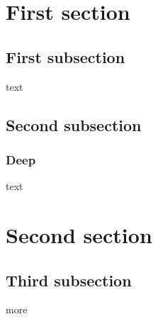 \documentclass{article}
\begin{document}
\setcounter{tocdepth}{1}
\tableofcontents
\section{First section}
\localtableofcontents
\subsection{First subsection}
text
\subsection{Second subsection}
\subsubsection{Deep}
text
\section{Second section}
\invisiblelocaltableofcontents
\subsection{Third subsection}
more
\end{document}
